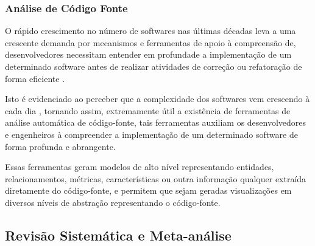 \documentclass[12pt]{article}
\begin{document}
%

\subsubsection{Análise de Código Fonte}

O rápido crescimento no número de softwares nas últimas décadas leva a uma
crescente demanda por mecanismos e ferramentas de apoio à compreensão de,
desenvolvedores necessitam entender em profundade a implementação de um
determinado software antes de realizar atividades de correção ou refatoração
de forma eficiente \cite{Kirkov2010}.

Isto é evidenciado ao perceber que a complexidade dos softwares vem crescendo
à cada dia \cite{Kirkov2010}, tornando assim, extremamente útil a existência
de ferramentas de análise automática de código-fonte, tais ferramentas
auxiliam os desenvolvedores e engenheiros à compreender a implementação de um
determinado software de forma profunda e abrangente.

Essas ferramentas geram modelos de alto nível representando entidades,
relacionamentos, métricas, características ou outra informação qualquer
extraída diretamente do código-fonte, e permitem que sejam geradas
visualizações em diversos níveis de abstração representando o código-fonte.



\subsection{Revisão Sistemática e Meta-análise}
\end{document}
